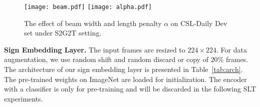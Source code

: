 \documentclass[final]{cvpr}
\begin{document}
\begin{table}[tp] 
   \centering
   \footnotesize
   \caption{Temporal Inception Network Architecture~\cite{cui-tmm19} (TIN) for sign language embedding. 
            1D Batch Norm (BN) layer is added after each temporal convolution layer.} \label{tab:arch}
\end{table}

\begin{figure}[tp]
   \centering
   \texttt{[image: beam.pdf]}
   \texttt{[image: alpha.pdf]}
   \caption{The effect of beam width and length penalty $\alpha$ on CSL-Daily Dev set under S2G2T setting.}\label{fig:alphabeam}
\vspace{-8pt}
\end{figure}



\textbf{Sign Embedding Layer.} 
The input frames are resized to $224\times224$. 
For data augmentation, we use random shift and random discard or copy of $20\%$ frames. 
The architecture of our sign embedding layer is presented in Table~\ref{tab:arch}. 
The pre-trained weights on ImageNet are loaded for initialization. 
The encoder with a classifier is only for pre-training and will be discarded in the following SLT experiments.    
\end{document}
